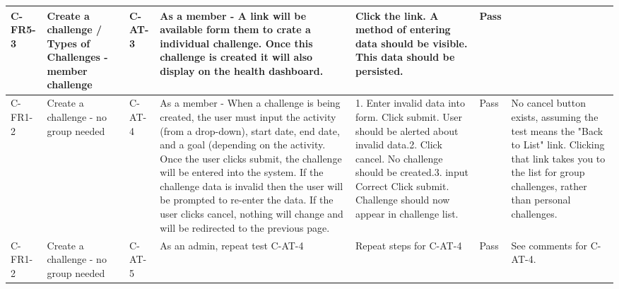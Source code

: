 \begin{longtable}{ |l|p{3cm}|l|p{5cm}|p{5cm}|l|p{6.5cm}|}
C-FR5-3        & Create a challenge / Types of Challenges - member challenge & C-AT-3  & As a member -  A link will be available form them to crate a individual challenge. Once this challenge is created it will also display on the health dashboard.                                                                                                                                                                                                                                                                                                                     & Click the link. A method of entering data should be visible. This data should be persisted.                                                                                                                              & Pass &                                                                                                                                                                                                                                                                  \\ \hline
C-FR1-2        & Create a challenge - no group needed                        & C-AT-4  & As a member - When a challenge is being created, the user must input the activity (from a drop-down), start date, end date, and a goal (depending on the activity. Once the user clicks submit, the challenge will be entered into the system. If the challenge data is invalid then the user will be prompted to re-enter the data. If the user clicks cancel, nothing will change and will be redirected to the previous page.                                                    & 1. Enter invalid data into form. Click submit. User should be alerted about invalid data.2. Click cancel. No challenge should be created.3. input Correct  Click submit. Challenge should now appear in challenge list. & Pass & No cancel button exists, assuming the test means the "Back to List" link.  Clicking that link takes you to the list for group challenges, rather than personal challenges.                                                                                       \\ \hline
C-FR1-2        & Create a challenge - no group needed                        & C-AT-5  & As an admin, repeat test C-AT-4                                                                                                                                                                                                                                                                                                                                                                                                                                                     & Repeat steps for C-AT-4                                                                                                                                                                                                  & Pass & See comments for C-AT-4.                                                                                                                                                                                                                                         \\ \hline

\end{longtable}
